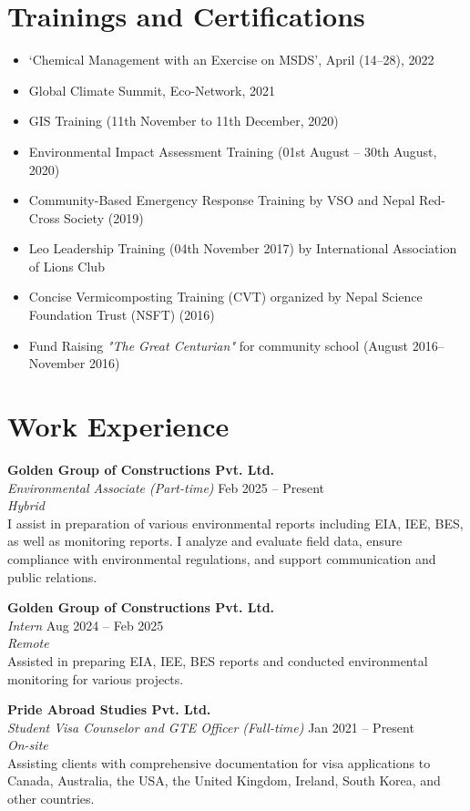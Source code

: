 \documentclass[a4paper,10pt]{article}
\begin{document}
\section{Trainings and Certifications}
\begin{itemize}
    \item ‘Chemical Management with an Exercise on MSDS’, April (14--28), 2022
    \item Global Climate Summit, Eco-Network, 2021
    \item GIS Training (11th November to 11th December, 2020)
    \item Environmental Impact Assessment Training (01st August -- 30th August, 2020)
    \item Community-Based Emergency Response Training by VSO and Nepal Red-Cross Society (2019)
    \item Leo Leadership Training (04th November 2017) by International Association of Lions Club
    \item Concise Vermicomposting Training (CVT) organized by Nepal Science Foundation Trust (NSFT) (2016)
    \item Fund Raising \textit{"The Great Centurian"} for community school (August 2016-- November 2016)
\end{itemize}

\section{Work Experience}


\textbf{Golden Group of Constructions Pvt. Ltd.} \\
\textit{Environmental Associate (Part-time)} \hfill Feb 2025 -- Present \\
\textit{Hybrid} \\
I assist in preparation of various environmental reports including EIA, IEE, BES, as well as monitoring reports. I analyze and evaluate field data, ensure compliance with environmental regulations, and support communication and public relations.

\vspace{0.5em}
\textbf{Golden Group of Constructions Pvt. Ltd.} \\
\textit{Intern} \hfill Aug 2024 -- Feb 2025 \\
\textit{Remote} \\
Assisted in preparing EIA, IEE, BES reports and conducted environmental monitoring for various projects.

\vspace{0.5em}
\textbf{Pride Abroad Studies Pvt. Ltd.} \\
\textit{Student Visa Counselor and GTE Officer (Full-time)} \hfill Jan 2021 -- Present \\
\textit{On-site} \\
Assisting clients with comprehensive documentation for visa applications to Canada, Australia, the USA, the United Kingdom, Ireland, South Korea, and other countries.
\end{document}
